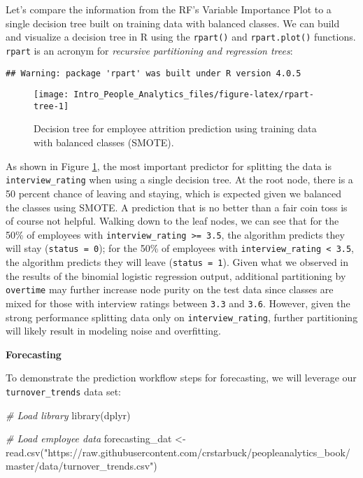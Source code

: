 \documentclass[
]{book}
\newenvironment{Shaded}{\begin{snugshade}}{\end{snugshade}}
\newcommand{\CommentTok}[1]{\textcolor[rgb]{0.56,0.35,0.01}{\textit{#1}}}
\newcommand{\FunctionTok}[1]{\textcolor[rgb]{0.00,0.00,0.00}{#1}}
\newcommand{\NormalTok}[1]{#1}
\newcommand{\OtherTok}[1]{\textcolor[rgb]{0.56,0.35,0.01}{#1}}
\newcommand{\StringTok}[1]{\textcolor[rgb]{0.31,0.60,0.02}{#1}}
\begin{document}
Let's compare the information from the RF's Variable Importance Plot to a single decision tree built on training data with balanced classes. We can build and visualize a decision tree in R using the \texttt{rpart()} and \texttt{rpart.plot()} functions. \texttt{rpart} is an acronym for \emph{recursive partitioning and regression trees}:

\begin{verbatim}
## Warning: package 'rpart' was built under R version 4.0.5
\end{verbatim}

\begin{figure}

{\centering \texttt{[image: Intro\_People\_Analytics\_files/figure-latex/rpart-tree-1]} 

}

\caption{Decision tree for employee attrition prediction using training data with balanced classes (SMOTE).}\label{fig:rpart-tree}
\end{figure}

As shown in Figure \ref{fig:rpart-tree}, the most important predictor for splitting the data is \texttt{interview\_rating} when using a single decision tree. At the root node, there is a 50 percent chance of leaving and staying, which is expected given we balanced the classes using SMOTE. A prediction that is no better than a fair coin toss is of course not helpful. Walking down to the leaf nodes, we can see that for the 50\% of employees with \texttt{interview\_rating\ \textgreater{}=\ 3.5}, the algorithm predicts they will stay (\texttt{status\ =\ 0}); for the 50\% of employees with \texttt{interview\_rating\ \textless{}\ 3.5}, the algorithm predicts they will leave (\texttt{status\ =\ 1}). Given what we observed in the results of the binomial logistic regression output, additional partitioning by \texttt{overtime} may further increase node purity on the test data since classes are mixed for those with interview ratings between \texttt{3.3} and \texttt{3.6}. However, given the strong performance splitting data only on \texttt{interview\_rating}, further partitioning will likely result in modeling noise and overfitting.

\textbf{Forecasting}

To demonstrate the prediction workflow steps for forecasting, we will leverage our \texttt{turnover\_trends} data set:

\begin{Shaded}
\begin{Highlighting}[]
\CommentTok{\# Load library}
\FunctionTok{library}\NormalTok{(dplyr)}

\CommentTok{\# Load employee data}
\NormalTok{forecasting\_dat }\OtherTok{\textless{}{-}} \FunctionTok{read.csv}\NormalTok{(}\StringTok{"https://raw.githubusercontent.com/crstarbuck/peopleanalytics\_book/master/data/turnover\_trends.csv"}\NormalTok{)}
\end{Highlighting}
\end{Shaded}
\end{document}

